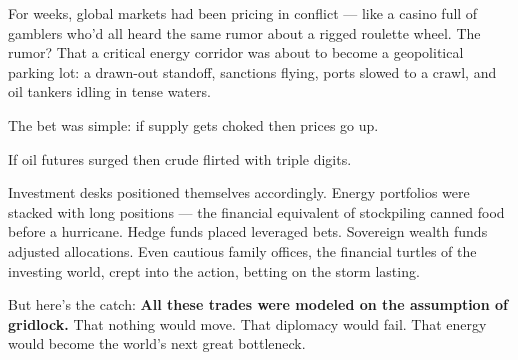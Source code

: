 For weeks, global markets had been pricing in conflict — like a casino full of gamblers who'd all heard the same rumor 
about a rigged roulette wheel. The rumor? That a critical energy corridor was about to become a geopolitical parking 
lot: a drawn-out standoff, sanctions flying, ports slowed to a crawl, and oil tankers idling in tense waters. 

The bet was simple: if supply gets choked then prices go up.

If oil futures surged then crude flirted with triple digits.

Investment desks positioned themselves accordingly. 
Energy portfolios were stacked with long positions — the financial equivalent of stockpiling canned food before a hurricane. 
Hedge funds placed leveraged bets. 
Sovereign wealth funds adjusted allocations. 
Even cautious family offices, the financial turtles of the investing world, crept into the action, 
betting on the storm lasting.

But here’s the catch:
\textbf{All these trades were modeled on the assumption of gridlock.}
That nothing would move. That diplomacy would fail. That energy would become the world’s next great bottleneck.

\medskip

